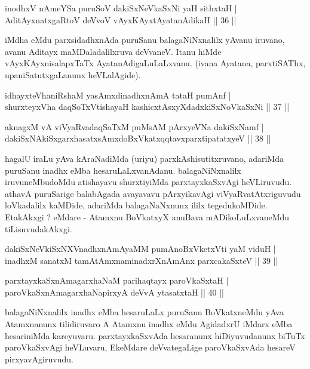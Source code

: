 
\begin{shl}
inodhxV nAmeYSa puruSoV dakiSxNeV\s kaSxNi yaH sithxtaH |\\
AditAyxnatxgaRtoV deVvoV vAyxKAyxtAyatanAdikaH \hfill || 36 || 
\end{shl}

\begin{artha}
iMdha eMdu parxsidadhxnAda puruSanu balagaNiNxnalilx yAvanu iruvano, avanu Aditayx maMDaladalilxruva deVvaneV. Itanu hiMde vAyxKAyxnisalapxTaTx AyatanAdigaLuLaLxvanu. (ivana Ayatana, parxtiSAThx, upaniSatutxgaLanunx heVLalAgide).
\end{artha}

\begin{shl}
idhayxteV\s haniRshaM yasAmxdinadhxnAmA tataH pumAnf |\\
shurxteyxVha daqSoTxV\s tishayaH kashicxtAsxyXdadxkiSxNoV\s kaSxNi \hfill || 37 || 
\end{shl}

\begin{shl}
aknagxM vA viVyaRvadaqSaTxM puMsAM pArxyeVNa dakiSxNamf |\\
dakiSxNAkiSxgarxhasatxsAmxdoBxVkatxqqtavxparxtipatatxyeV \hfill || 38 || 
\end{shl}

\begin{artha}
hagalU iraLu yAva kAraNadiMda (uriyu) parxkAshisutitxruvano, adariMda puruSanu inadhx eMba hesaruLaLxvanAdanu. balagaNiNxnalilx iruvuneMbudoMdu atishayavu shurxtiyiMda parxtayxkaSxvAgi heVLiruvudu. athavA puruSarige balabAgada avayavavu pArxyikavAgi viVyaRvatAtxriguvudu loVkadalilx kaMDide, adariMda balagaNaNxnunx ililx tegedukoMDide. EtakAkxgi ? eMdare - Atamxnu BoVkatxyX anuBava mADikoLuLxvaneMdu tiLisuvudakAkxgi.
\end{artha}

\begin{shl}
dakiSxNeV\s kiSxNXVnadhxnAmA\s yaMM pumAnoBxVketxVti yaM viduH |\\
inadhxM sanatxM tamAtAmxnaminadxrXnAmAnx parxcakaSxteV \hfill || 39 || 
\end{shl}

\begin{shl}
parxtayxkaSxnAmagarxhaNaM parihaqtayx paroVkaSxtaH |\\
paroVkaSxnAmagarxhaNapirxyA deVvA ytasatxtaH \hfill || 40 || 
\end{shl}

\begin{artha}
balagaNiNxnalilx inadhx eMba hesaruLaLx puruSanu BoVkatxneMdu yAva Atamxnanunx tilidiruvaro A Atamxnu inadhx eMdu AgidadxrU iMdarx eMba hesariniMda kareyuvaru. parxtayxkaSxvAda hesaranunx hiDiyuvudanunx biTuTx paroVkaSxvAgi heVLuvaru, EkeMdare deVvategaLige paroVkaSxvAda hesareV pirxyavAgiruvudu.
\end{artha}

